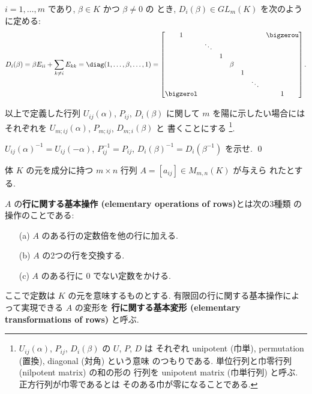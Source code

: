 \documentclass[12pt,twoside]{jarticle}
\begin{document}
$i=1,\ldots,m$ であり,  $\beta\in K$ かつ $\beta\ne 0$ の
とき, $D_i(\beta)\in GL_m(K)$ を次のように定める:
\begin{equation*}
  D_i(\beta) = \beta E_{ii} + \sum_{k\ne i} E_{kk} 
  = \diag(1,\ldots,\beta,\ldots,1) =
  \begin{bmatrix}
    1 &        &   &       &   & & \bigzerou \\
      & \ddots &   &       &   & & \\
      &        & 1 &       &   & & \\
      &        &   & \beta &   & & \\
      &        &   &       & 1 & & \\
      &        &   &       &   & \ddots & \\
    \bigzerol & &  &       &   &        & 1 \\
  \end{bmatrix}.
\end{equation*}

以上で定義した行列 $U_{ij}(\alpha)$, $P_{ij}$, $D_i(\beta)$ 
に関して $m$ を陽に示したい場合には
それぞれを $U_{m;ij}(\alpha)$, $P_{m;ij}$, $D_{m;i}(\beta)$ と
書くことにする%
\footnote{$U_{ij}(\alpha)$, $P_{ij}$, $D_i(\beta)$ の $U$, $P$, $D$ は
  それぞれ unipotent (巾単), permutation (置換), diagonal (対角) という意味
  のつもりである. 単位行列と巾零行列 (nilpotent matrix) の和の形の
  行列を unipotent matrix (巾単行列) と呼ぶ.  正方行列が巾零であるとは
  そのある巾が零になることである.}.

\begin{question}[5点]
  \label{q:inv-U,P,D}
  $U_{ij}(\alpha)^{-1}=U_{ij}(-\alpha)$, 
  $P_{ij}^{-1}=P_{ij}$, 
  $D_i(\beta)^{-1}=D_i(\beta^{-1})$ を示せ. 
  \qed
\end{question}


体 $K$ の元を成分に持つ $m\times n$ 行列 $A=[a_{ij}]\in M_{m,n}(K)$ が与えら
れたとする.

$A$ の{\bf 行に関する基本操作 (elementary operations of rows)}とは次の3種類
の操作のことである:
\begin{enumerate}
\item[(a)] $A$ のある行の定数倍を他の行に加える.
\item[(b)] $A$ の2つの行を交換する.
\item[(c)] $A$ のある行に $0$ でない定数をかける.
\end{enumerate}
ここで定数は $K$ の元を意味するものとする.
有限回の行に関する基本操作によって実現できる $A$ の変形を
{\bf 行に関する基本変形 (elementary transformations of rows)} と呼ぶ.
\end{document}
